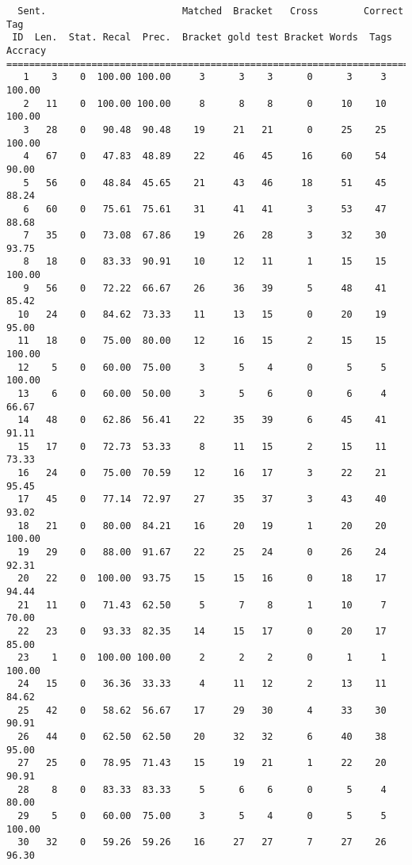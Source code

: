 \scriptsize
\begin{verbatim}
  Sent.                        Matched  Bracket   Cross        Correct Tag
 ID  Len.  Stat. Recal  Prec.  Bracket gold test Bracket Words  Tags Accracy
============================================================================
   1    3    0  100.00 100.00     3      3    3      0      3     3   100.00
   2   11    0  100.00 100.00     8      8    8      0     10    10   100.00
   3   28    0   90.48  90.48    19     21   21      0     25    25   100.00
   4   67    0   47.83  48.89    22     46   45     16     60    54    90.00
   5   56    0   48.84  45.65    21     43   46     18     51    45    88.24
   6   60    0   75.61  75.61    31     41   41      3     53    47    88.68
   7   35    0   73.08  67.86    19     26   28      3     32    30    93.75
   8   18    0   83.33  90.91    10     12   11      1     15    15   100.00
   9   56    0   72.22  66.67    26     36   39      5     48    41    85.42
  10   24    0   84.62  73.33    11     13   15      0     20    19    95.00
  11   18    0   75.00  80.00    12     16   15      2     15    15   100.00
  12    5    0   60.00  75.00     3      5    4      0      5     5   100.00
  13    6    0   60.00  50.00     3      5    6      0      6     4    66.67
  14   48    0   62.86  56.41    22     35   39      6     45    41    91.11
  15   17    0   72.73  53.33     8     11   15      2     15    11    73.33
  16   24    0   75.00  70.59    12     16   17      3     22    21    95.45
  17   45    0   77.14  72.97    27     35   37      3     43    40    93.02
  18   21    0   80.00  84.21    16     20   19      1     20    20   100.00
  19   29    0   88.00  91.67    22     25   24      0     26    24    92.31
  20   22    0  100.00  93.75    15     15   16      0     18    17    94.44
  21   11    0   71.43  62.50     5      7    8      1     10     7    70.00
  22   23    0   93.33  82.35    14     15   17      0     20    17    85.00
  23    1    0  100.00 100.00     2      2    2      0      1     1   100.00
  24   15    0   36.36  33.33     4     11   12      2     13    11    84.62
  25   42    0   58.62  56.67    17     29   30      4     33    30    90.91
  26   44    0   62.50  62.50    20     32   32      6     40    38    95.00
  27   25    0   78.95  71.43    15     19   21      1     22    20    90.91
  28    8    0   83.33  83.33     5      6    6      0      5     4    80.00
  29    5    0   60.00  75.00     3      5    4      0      5     5   100.00
  30   32    0   59.26  59.26    16     27   27      7     27    26    96.30

\end{verbatim}
